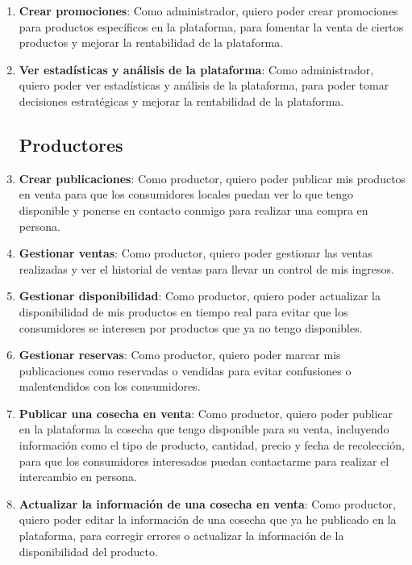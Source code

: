 \begin{enumerate}[HU-1:]
\item \textbf{Crear promociones}: Como administrador, quiero poder crear promociones para productos específicos en la plataforma, para fomentar la venta de ciertos productos y mejorar la rentabilidad de la plataforma.

\item \textbf{Ver estadísticas y análisis de la plataforma}: Como administrador, quiero poder ver estadísticas y análisis de la plataforma, para poder tomar decisiones estratégicas y mejorar la rentabilidad de la plataforma.

\subsection{Productores}

\item \textbf{Crear publicaciones}: Como productor, quiero poder publicar mis productos en venta para que los consumidores locales puedan ver lo que tengo disponible y ponerse en contacto conmigo para realizar una compra en persona.

\item \textbf{Gestionar ventas}: Como productor, quiero poder gestionar las ventas realizadas y ver el historial de ventas para llevar un control de mis ingresos.

\item \textbf{Gestionar disponibilidad}: Como productor, quiero poder actualizar la disponibilidad de mis productos en tiempo real para evitar que los consumidores se interesen por productos que ya no tengo disponibles.

\item \textbf{Gestionar reservas}: Como productor, quiero poder marcar mis publicaciones como reservadas o vendidas para evitar confusiones o malentendidos con los consumidores.

\item \textbf{Publicar una cosecha en venta}: Como productor, quiero poder publicar en la plataforma la cosecha que tengo disponible para su venta, incluyendo información como el tipo de producto, cantidad, precio y fecha de recolección, para que los consumidores interesados puedan contactarme para realizar el intercambio en persona.

\item \textbf{Actualizar la información de una cosecha en venta}: Como productor, quiero poder editar la información de una cosecha que ya he publicado en la plataforma, para corregir errores o actualizar la información de la disponibilidad del producto.


\end{enumerate}
